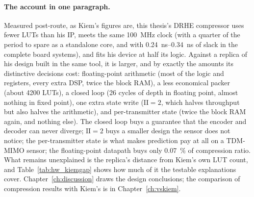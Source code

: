 \paragraph{The account in one paragraph.} Measured post-route, as Kiem's
figures are, this thesis's DRHE compressor uses fewer LUTs than his IP, meets
the same \SI{100}{\mega\hertz} clock (with a quarter of the period to spare as
a standalone core, and with \SIrange{0.24}{0.34}{\nano\second} of slack in the
complete board systems), and fits his device at half its logic. Against a replica of his design built in the
same tool, it is larger, and by exactly the amounts its distinctive decisions
cost: floating-point arithmetic (most of the logic and registers, every extra
DSP, twice the block RAM), a less economical packer (about \num{4200} LUTs), a
closed loop (26 cycles of depth in floating point, almost nothing in fixed
point), one extra state write ($\mathrm{II} = 2$, which halves throughput but
also halves the arithmetic), and per-transmitter state (twice the block RAM
again, and nothing else). The closed loop buys a guarantee that the encoder and
decoder can never diverge; $\mathrm{II} = 2$ buys a smaller design the sensor
does not notice; the per-transmitter state is what makes prediction pay at all
on a TDM-MIMO sensor; the floating-point datapath buys only \SI{0.07}{\percent}
of compression ratio. What remains unexplained is the replica's distance from
Kiem's own LUT count, and Table~\ref{tab:hw_kiemgap} shows how much of it the
testable explanations cover. Chapter~\ref{ch:discussion} draws the design
conclusions; the comparison of compression results with Kiem's is in
Chapter~\ref{ch:vskiem}.
